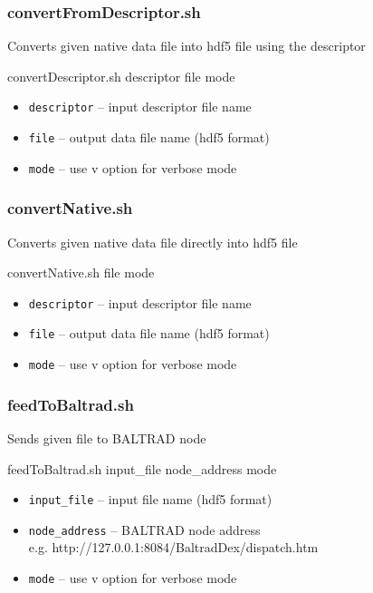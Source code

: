 \documentclass[11p]{article}
\begin{document}
\subsubsection*{convertFromDescriptor.sh}  
Converts given native data file into hdf5 file using the descriptor

\begin{kod}
convertDescriptor.sh descriptor file mode
\end{kod}
\begin{itemize}
    \item \texttt{descriptor} -- input descriptor file name
    \item \texttt{file} -- output data file name (hdf5 format)
    \item \texttt{mode} -- use v option for verbose mode
\end{itemize}
\subsubsection*{convertNative.sh}
Converts given native data file directly into hdf5 file

\begin{kod}
convertNative.sh file mode
\end{kod}
\begin{itemize}
    \item \texttt{descriptor} -- input descriptor file name
    \item \texttt{file} -- output data file name (hdf5 format)
    \item \texttt{mode} -- use v option for verbose mode
\end{itemize}
\subsubsection*{feedToBaltrad.sh}
Sends given file to BALTRAD node

\begin{kod}
feedToBaltrad.sh input\_file node\_address mode
\end{kod}
\begin{itemize}
    \item \texttt{input\_file} -- input file name (hdf5 format)
    \item \texttt{node\_address} -- BALTRAD node address\\
                        e.g. http://127.0.0.1:8084/BaltradDex/dispatch.htm
    \item \texttt{mode} -- use v option for verbose mode
\end{itemize}
\end{document}
